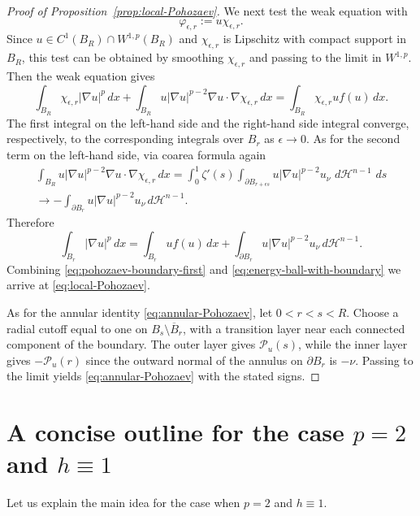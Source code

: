 \documentclass[reqno,12pt]{amsart}
\numberwithin{equation}{section}
\theoremstyle{remark}
\newcommand{\dd}{\,d}
\newcommand{\Pscr}{\mathscr P}
\begin{document}
\begin{proof}[Proof of Proposition~\ref{prop:local-Pohozaev}]
We next test the weak equation with
$$
\varphi_{\epsilon,r}:=u\chi_{\epsilon,r}.
$$
Since $u\in C^1(B_R)\cap W^{1,p}(B_R)$ and $\chi_{\epsilon,r}$ is Lipschitz with compact support in $B_R$, this test can be obtained by smoothing $\chi_{\epsilon,r}$ and passing to the limit in $W^{1,p}$.  Then the weak equation gives
$$
\int_{B_R}\chi_{\epsilon,r}|\nabla u|^p\dd x +\int_{B_R}u|\nabla u|^{p-2}\nabla u\cdot\nabla\chi_{\epsilon,r}\dd x
= \int_{B_R}\chi_{\epsilon,r}u f(u)\dd x.
$$
The first integral  on the left-hand side and the right-hand side  integral converge, respectively, to the corresponding integrals over $B_r$ as $\epsilon\to 0$.  As for the second term on the left-hand side, via coarea formula again
\begin{multline*}
\int_{B_R}u|\nabla u|^{p-2}\nabla u\cdot\nabla\chi_{\epsilon,r}\dd x=
\int_0^1\zeta'(s) \int_{\partial B_{r+\epsilon s}} u|\nabla u|^{p-2}u_\nu\,\dd \mathcal H^{n-1}\,\dd s\\
\to -\int_{\partial B_r}u|\nabla u|^{p-2}u_\nu\dd \mathcal H^{n-1}.
\end{multline*}
Therefore
\begin{equation}\label{eq:energy-ball-with-boundary}
\int_{B_r}|\nabla u|^p\dd x
=\int_{B_r}u f(u)\dd x
 +\int_{\partial B_r}u|\nabla u|^{p-2}u_\nu\dd \mathcal H^{n-1}.
\end{equation}
Combining \eqref{eq:pohozaev-boundary-first} and \eqref{eq:energy-ball-with-boundary} we arrive at \eqref{eq:local-Pohozaev}.  

As for the annular identity \eqref{eq:annular-Pohozaev}, let $0<r<s<R$. Choose a radial cutoff equal to one on
$B_s\setminus\overline B_r$, with a transition layer near each connected component of the boundary. The outer layer gives $\Pscr_u(s)$, while the inner layer gives $-\Pscr_u(r)$ since the outward normal of the annulus on
$\partial B_r$ is $-\nu$. Passing to the limit yields
\eqref{eq:annular-Pohozaev} with the stated signs.
\end{proof}


\section{A concise outline for the case \texorpdfstring{$p=2$ and $h\equiv1$}{p=2 and h=1}}
\label{appen:B}

Let us explain the main idea for the case when $p=2$ and $h\equiv 1$.
\end{document}
